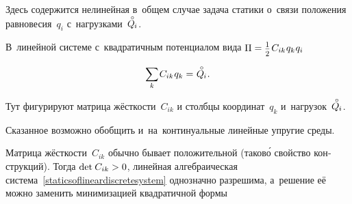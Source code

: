 \begin{otherlanguage}{russian}
\vspace{-0.12em} \noindent Здесь содержится нелинейная в~общем случае задача статики о~связи положения равновесия~$q_i$ с~нагрузками~${\mathcircabove{Q}_{\hspace{-0.1ex}i}}$.

В~линейной системе с~квадратичным потенциалом вида ${\Pi = \smalldisplaystyleonehalf \hspace{.2ex} C_{ik} \hspace{.12ex} q_{k} \hspace{.1ex} q_{i}}$

\nopagebreak\vspace{-1.25em}\begin{equation}\label{staticsoflineardiscretesystem}
\scalebox{0.95}[1]{$\displaystyle \sum_{\smash{k}}$} \hspace{.2ex} C_{ik} \hspace{.12ex} q_k
= \hspace{.1ex} \mathcircabove{Q}_{\hspace{-0.1ex}i} \hspace{.1ex} .
\vspace{-0.1em}\end{equation}

\vspace{-0.2em} \noindent Тут фигурируют матрица жёсткости~$C_{ik}$ и столбцы координат~${q_k}$ и~нагрузок~${\mathcircabove{Q}_{\hspace{-0.1ex}i}}$.

Сказанное возможно обобщить и~на~континуальные линейные упругие среды.

Матрица жёсткости~${C_{ik}}$ обычно бывает положительной (таков\'{о} свойство конструкций). %
Тогда ${\operatorname{det} \hspace{.16ex} C_{ik} > 0}$, линейная алгебраическая система~\eqref{staticsoflineardiscretesystem} однозначно разрешима, а~решение её можно заменить минимизацией квадратичной формы


\end{otherlanguage}
